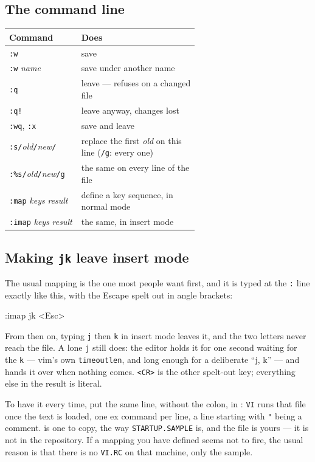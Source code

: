 \subsection*{The command line}
\begin{center}
\small
\begin{tabular}{@{}l >{\raggedright\arraybackslash}p{0.62\linewidth}@{}}
\toprule
\textbf{Command} & \textbf{Does} \\
\midrule
\texttt{:w} & save \\
\texttt{:w} \emph{name} & save under another name \\
\texttt{:q} & leave --- refuses on a changed file \\
\texttt{:q!} & leave anyway, changes lost \\
\texttt{:wq}, \texttt{:x} & save and leave \\
\texttt{:s/}\emph{old}\texttt{/}\emph{new}\texttt{/} & replace the first \emph{old} on this line (\texttt{/g}: every one) \\
\texttt{:\%s/}\emph{old}\texttt{/}\emph{new}\texttt{/g} & the same on every line of the file \\
\texttt{:map} \emph{keys} \emph{result} & define a key sequence, in normal mode \\
\texttt{:imap} \emph{keys} \emph{result} & the same, in insert mode \\
\bottomrule
\end{tabular}
\end{center}

\subsection*{Making \texttt{jk} leave insert mode}
The usual mapping is the one most people want first, and it is typed at
the \verb|:| line exactly like this, with the Escape spelt out in angle
brackets:

\begin{type}
:imap jk <Esc>
\end{type}

\noindent From then on, typing \verb|j| then \verb|k| in insert mode
leaves it, and the two letters never reach the file. A lone \verb|j|
still does: the editor holds it for one second waiting for the
\verb|k| --- vim's own \texttt{timeoutlen}, and long enough for a
deliberate ``j, k'' --- and hands it over when nothing comes. \verb|<CR>| is the other
spelt-out key; everything else in the result is literal.

To have it every time, put the same line, without the colon, in
: \verb|VI| runs that file once the text is
loaded, one ex command per line, a line starting with \verb|"| being a
comment.  is one to copy, the way
\texttt{STARTUP.SAMPLE} is, and the file is yours --- it is not in the
repository. If a mapping you have defined seems not to fire, the usual
reason is that there is no \texttt{VI.RC} on that machine, only the
sample.

